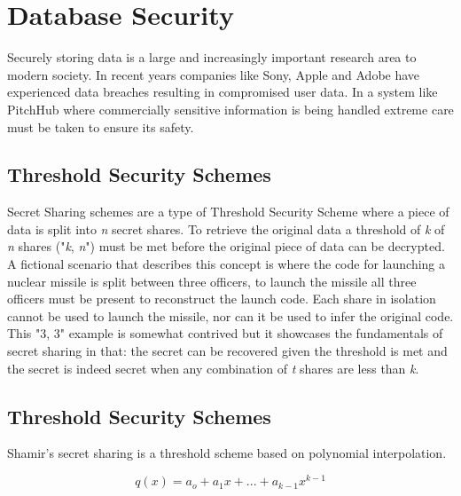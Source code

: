 \section{Database Security}
Securely storing data is a large and increasingly important research area to modern society. In recent years companies like Sony, Apple and Adobe have experienced data breaches resulting in compromised user data. In a system like PitchHub where commercially sensitive information is being handled extreme care must be taken to ensure its safety.

\subsection{Threshold Security Schemes}
Secret Sharing schemes are a type of Threshold Security Scheme where a piece of data is split into \textit{n} secret shares. To retrieve the original data a threshold of \textit{k} of \textit{n} shares ("\textit{k}, \textit{n}") must be met before the original piece of data can be decrypted. A fictional scenario that describes this concept is where the code for launching a nuclear missile is split between three officers, to launch the missile all three officers must be present to reconstruct the launch code. Each share in isolation cannot be used to launch the missile, nor can it be used to infer the original code. This "3, 3" example is somewhat contrived but it showcases the fundamentals of secret sharing in that: the secret can be recovered given the threshold is met and the secret is indeed secret when any combination of \textit{t} shares are less than \textit{k}.

\subsection{Threshold Security Schemes}
Shamir's secret sharing \cite{shamir1979share} is a threshold scheme based on polynomial interpolation. 

\[q(x) = a_o +a_1x + ... + a_{k-1}x^{k-1} \]

